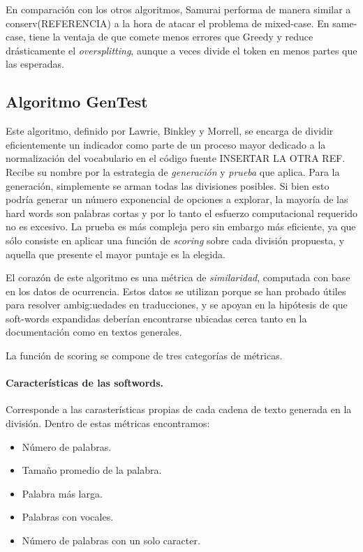 En comparación con los otros algoritmos, Samurai performa de manera similar a conserv(REFERENCIA) a la hora de atacar el problema de mixed-case.
En same-case, tiene la ventaja de que comete menos errores que Greedy y reduce drásticamente el \textit{oversplitting}, aunque a veces divide el token en menos partes que las esperadas.

\subsection{Algoritmo GenTest}
Este algoritmo, definido por Lawrie, Binkley y Morrell, se encarga de dividir eficientemente un indicador como parte de un proceso mayor dedicado a la normalización del vocabulario en el código fuente \cite{LawrieBinkleyMorrell2010} INSERTAR LA OTRA REF.
Recibe su nombre por la estrategia de \textit{generación} y \textit{prueba} que aplica.
Para la generación, simplemente se arman todas las divisiones posibles.
Si bien esto podría generar un número exponencial de opciones a explorar, la mayoría de las hard words son palabras cortas y por lo tanto el esfuerzo computacional requerido no es excesivo.
La prueba es más compleja pero sin embargo más eficiente, ya que sólo consiste en aplicar una función de \textit{scoring} sobre cada división propuesta, y aquella que presente el mayor puntaje es la elegida.

El corazón de este algoritmo es una métrica de \textit{similaridad}, computada con base en los datos de ocurrencia.
Estos datos se utilizan porque se han probado útiles para resolver ambig:uedades en traducciones, y se apoyan en la hipótesis de que soft-words expandidas deberían encontrarse ubicadas cerca tanto en la documentación como en textos generales.

La función de scoring se compone de tres categorías de métricas.
\paragraph{Características de las softwords.}
Corresponde a las carasterísticas propias de cada cadena de texto generada en la división.
Dentro de estas métricas encontramos:
\begin{itemize}
  \item Número de palabras.
  \item Tamaño promedio de la palabra.
  \item Palabra más larga.
  \item Palabras con vocales.
  \item Número de palabras con un solo caracter.
\end{itemize}

